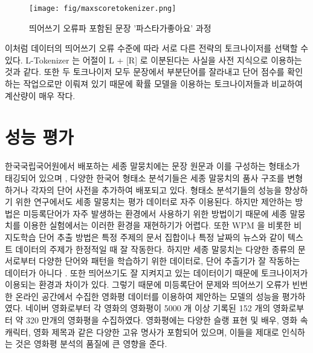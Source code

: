 \documentclass[oneside, ko,phd]{snuthesis_utf8_kor}
\begin{document}
\begin{figure}[ht]
\centering
\texttt{[image: fig/maxscoretokenizer.png]}
\caption{띄어쓰기 오류파 포함된 문장 '파스타가좋아요' 과정}
\label{fig:maxscoretokenizer}    
\end{figure}

이처럼 데이터의 띄어쓰기 오류 수준에 따라 서로 다른 전략의 토크나이저를 선택할 수 있다.
L-Tokenizer 는 어절이 L + [R] 로 이분된다는 사실을 사전 지식으로 이용하는 것과 같다.
또한 두 토크나이저 모두 문장에서 부분단어를 잘라내고 단어 점수를 확인하는 작업으로만 이뤄져 있기 때문에 확률 모델을 이용하는 토크나이저들과 비교하여 계산량이 매우 작다.


\section{성능 평가} \label{word_extraction_performance}
한국국립국어원에서 배포하는 세종 말뭉치에는 문장 원문과 이를 구성하는 형태소가 태깅되어 있으며 \cite{kim200121st}, 다양한 한국어 형태소 분석기들은 세종 말뭉치의 품사 구조를 변형하거나 각자의 단어 사전을 추가하여 배포되고 있다.
형태소 분석기들의 성능을 향상하기 위한 연구에서도 세종 말뭉치는 평가 데이터로 자주 이용된다.
하지만 제안하는 방법은 미등록단어가 자주 발생하는 환경에서 사용하기 위한 방법이기 때문에 세종 말뭉치를 이용한 실험에서는 이러한 환경을 재현하기가 어렵다.
또한 WPM 을 비롯한 비지도학습 단어 추출 방법은 특정 주제의 문서 집합이나 특정 날짜의 뉴스와 같이 텍스트 데이터의 주제가 한정적일 때 잘 작동한다.
하지만 세종 말뭉치는 다양한 종류의 문서로부터 다양한 단어와 패턴을 학습하기 위한 데이터로, 단어 추출기가 잘 작동하는 데이터가 아니다 \cite{kim2014kr}.
또한 띄어쓰기도 잘 지켜지고 있는 데이터이기 때문에 토크나이저가 이용되는 환경과 차이가 있다.
그렇기 때문에 미등록단어 문제와 띄어쓰기 오류가 빈번한 온라인 공간에서 수집한 영화평 데이터를 이용하여 제안하는 모델의 성능을 평가하였다.
네이버 영화로부터 각 영화의 영화평이 5000 개 이상 기록된 152 개의 영화로부터 약 320 만개의 영화평을 수집하였다.
영화평에는 다양한 슬랭 표현 및 배우, 영화 속 캐릭터, 영화 제목과 같은 다양한 고유 명사가 포함되어 있으며, 이들을 제대로 인식하는 것은 영화평 분석의 품질에 큰 영향을 준다.
\end{document}

